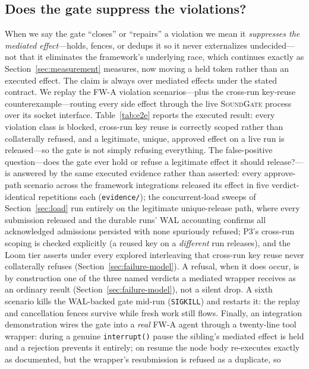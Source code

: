 \documentclass[10pt,journal,compsoc]{IEEEtran}
\newcommand{\sys}{\textsc{SoundGate}}
\begin{document}
\subsection{Does the gate suppress the violations?}
\noindent When we say the gate
``closes'' or ``repairs'' a violation we mean it \emph{suppresses the mediated
effect}---holds, fences, or dedups it so it never externalizes undecided---not
that it eliminates the framework's underlying race, which continues exactly as
Section~\ref{sec:measurement} measures, now moving a held token rather than an
executed effect. The claim is always over mediated effects under the stated
contract.
We replay the \textsf{FW-A} violation scenarios---plus the cross-run key-reuse
counterexample---routing every side effect through the live \sys{} process over
its socket interface. Table~\ref{tab:e2e} reports the executed result: every
violation class is blocked, cross-run key reuse is correctly scoped rather than
collaterally refused, and a legitimate, unique, approved effect on a live run
is released---so the gate is not simply refusing everything. The
false-positive question---does the gate ever hold or refuse a legitimate
effect it should release?---is answered by the same executed evidence rather
than asserted: every approve-path scenario across the framework integrations
released its effect in five verdict-identical repetitions each
(\texttt{evidence/}); the concurrent-load sweeps of Section~\ref{sec:load}
run entirely on the legitimate unique-release path, where every submission
released and the durable runs' WAL accounting confirms all
acknowledged admissions persisted with none spuriously refused; P3's
cross-run scoping is checked explicitly (a reused key on a \emph{different}
run releases), and the Loom tier asserts under every explored interleaving
that cross-run key reuse never collaterally refuses
(Section~\ref{sec:failure-model}). A refusal, when it does occur, is by
construction one of the three named verdicts a mediated wrapper receives as
an ordinary result (Section~\ref{sec:failure-model}), not a silent drop. A sixth scenario
kills the WAL-backed gate mid-run (\texttt{SIGKILL}) and restarts it: the
replay and cancellation fences survive while fresh work still flows.
Finally, an integration demonstration wires the gate into a \emph{real}
\textsf{FW-A} agent through a twenty-line tool wrapper: during a genuine
\texttt{interrupt()} pause the sibling's mediated effect is held and a
rejection prevents it entirely; on resume the node body re-executes exactly
as documented, but the wrapper's resubmission is refused as a duplicate, so
\end{document}
